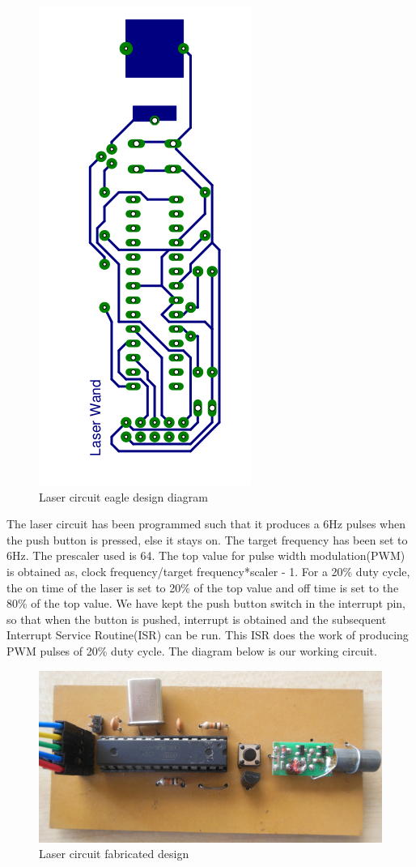 \documentclass[12pt, a4paper]{article}
\begin{document}
\begin{figure}[htp]
	\centering
	\includegraphics[scale=0.3]{eagle-non-mirror.png}
	\caption{Laser circuit eagle design diagram}
	\label{}
\end{figure}

	The laser circuit has been programmed such that it produces a 6Hz pulses when the push button is pressed, else it stays on. The target frequency has been set to 6Hz. The prescaler used is 64. The top value for pulse width modulation(PWM) is obtained as, 
	clock frequency/target frequency*scaler - 1. 
	 For a 20\% duty cycle, the on time of the laser is set to 20\% of the top value and off time is set to the 80\% of the top value. We have kept the push button switch in the interrupt pin, so that when the button is pushed, interrupt is obtained and the subsequent Interrupt Service Routine(ISR) can be run. This ISR does the work of producing PWM pulses of 20\% duty cycle. The diagram below is our working circuit.

\begin{figure}[htp]
	\centering
	\includegraphics[scale=0.2]{front.png}
	\caption{Laser circuit fabricated design}
	\label{}
\end{figure}
\end{document}
